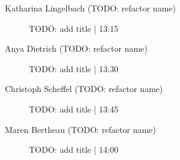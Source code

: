 \begin{symposium}
\begin{description}
                \item [Katharina Lingelbach (TODO: refactor name)] TODO: add title \textcolor{mygray}{ | 13:15}    
                
                \item [Anya Dietrich (TODO: refactor name)] TODO: add title \textcolor{mygray}{ | 13:30}    
                
                \item [Christoph Scheffel (TODO: refactor name)] TODO: add title \textcolor{mygray}{ | 13:45}    
                
                \item [Maren Bertheau (TODO: refactor name)] TODO: add title \textcolor{mygray}{ | 14:00}    
                
            \end{description} 
            \end{symposium}
            